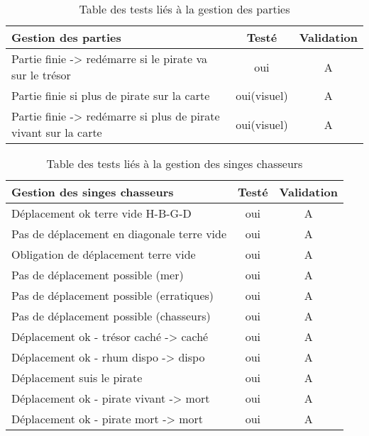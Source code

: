 \begin{table}[!h]
\begin{center}
\begin{tabular}{|p{10cm}|c|c|}
\hline
\textbf{Gestion des parties} & \textbf{Testé} & \textbf{Validation} \\\hline
Partie finie -> redémarre si le pirate va sur le trésor & oui & A \\\hline
Partie finie si plus de pirate sur la carte & oui(visuel) & A \\\hline
Partie finie -> redémarre si plus de pirate vivant sur la carte & oui(visuel) & A \\\hline
\end{tabular}
\end{center}
\caption{Table des tests liés à la gestion des parties}
\end{table}

\begin{table}[!h]
\begin{center}
\begin{tabular}{|p{10cm}|c|c|}
\hline
\textbf{Gestion des singes chasseurs} & \textbf{Testé} & \textbf{Validation} \\\hline
Déplacement ok terre vide H-B-G-D 			& oui & A \\\hline
Pas de déplacement en diagonale terre vide 	& oui & A \\\hline
Obligation de déplacement terre vide 		& oui & A \\\hline
Pas de déplacement possible (mer) 			& oui & A \\\hline
Pas de déplacement possible (erratiques)	& oui & A \\\hline
Pas de déplacement possible (chasseurs)		& oui & A \\\hline
Déplacement ok - trésor caché -> caché		& oui & A \\\hline
Déplacement ok - rhum dispo -> dispo		& oui & A \\\hline
Déplacement suis le pirate					& oui & A \\\hline
Déplacement ok - pirate vivant -> mort		& oui & A \\\hline
Déplacement ok - pirate mort -> mort		& oui & A \\\hline
\end{tabular}
\end{center}
\caption{Table des tests liés à la gestion des singes chasseurs}
\end{table}

